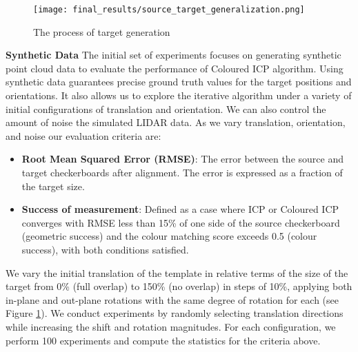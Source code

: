


\begin{figure}[h]
    \centering
    \texttt{[image: final\_results/source\_target\_generalization.png]}
    \caption{The process of target generation}
    \label{fig:target_generation_process}
\end{figure}
\textbf{Synthetic Data} The initial set of experiments focuses on generating synthetic point cloud data to evaluate the performance of Coloured ICP algorithm. Using synthetic data guarantees precise ground truth values for the target positions and orientations. It also allows us to explore the iterative algorithm under a variety of initial configurations of translation and orientation. We can also control the amount of noise the simulated LIDAR data.
As we vary translation, orientation, and noise our evaluation criteria are: 
\begin{itemize}
    \item \textbf{Root Mean Squared Error (RMSE)}: The error between the source and target checkerboards after alignment. The error is expressed as a fraction of the target size.
    \item \textbf{Success of measurement}: Defined as a case where ICP or Coloured ICP converges with RMSE less than 15\% of one side of the source checkerboard (geometric success) and the colour matching score exceeds 0.5 (colour success), with both conditions satisfied.
\end{itemize}

We vary the initial translation of the template in relative terms of the size of the target from 0\% (full overlap) to 150\% (no overlap) in steps of 10\%, applying both in-plane and out-plane rotations with the same degree of rotation for each (see Figure \ref{fig:target_generation_process}). We conduct experiments by randomly selecting translation directions while increasing the shift and rotation magnitudes. For each configuration, we perform 100 experiments and compute the statistics for the criteria above.



